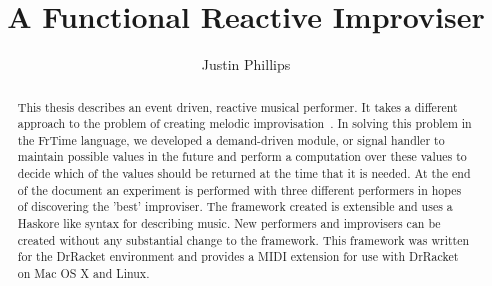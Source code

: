 \documentclass[12pt]{ucthesis}
\begin{document}

\title{A Functional Reactive Improviser}
\author{Justin Phillips}
  
 
     



\maketitle

\begin{frontmatter}

\copyrightpage

\committeemembershippage

\begin{abstract}

This thesis describes an event driven, reactive musical performer. It takes a different approach to the problem of creating melodic improvisation~\cite{bob}. In solving this problem in the FrTime language, we developed a demand-driven module, or signal handler to maintain possible values in the future and perform a computation over these values to decide which of the values should be  returned at the time that it is needed. At the end of the document an experiment is performed with three different performers in hopes of discovering the 'best' improviser. The framework created is extensible and uses a Haskore like syntax for describing music. New performers and improvisers can be created without any substantial change to the framework. This framework was written for the DrRacket environment and provides a MIDI extension for use with DrRacket on Mac OS X and Linux. 

\end{abstract}





\tableofcontents


\listoftables

\listoffigures

\end{frontmatter}
\end{document}

